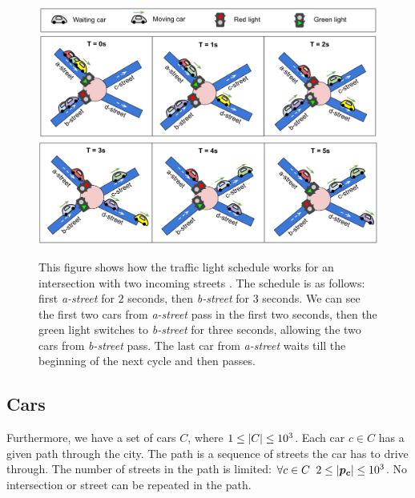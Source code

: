\begin{figure}[ht] %
    \centering
    \includegraphics[width=\linewidth]{img/hashcode/figure2-abc.png}
    \includegraphics[width=\linewidth]{img/hashcode/figure2-def.png}
    \caption[Example of a traffic light schedule]{
        This figure shows how the traffic light schedule works for an intersection with two incoming streets \cite{google_coding_competitions}.
        The schedule is as follows: first \textit{a-street} for $2$ seconds, then \textit{b-street} for $3$ seconds.
        We can see the first two cars from \textit{a-street} pass in the first two seconds, then the green light switches to \textit{b-street} for three seconds,
        allowing the two cars from \textit{b-street} pass. The last car from \textit{a-street} waits till the beginning of the next cycle and then passes.
    }
    \label{fig:hashcode_traffic_lights}
\end{figure}

\subsection{Cars}

Furthermore, we have a set of cars $C$, where $1 \leq \left|{C}\right| \leq 10^3$. Each car $c \in C$ has a given path through the city. The path is a sequence of streets the car has to drive through. The number of streets in the path is limited: $\forall c \in C \;\; 2 \leq \left|{\bm{p_c}}\right| \leq 10^3$. No intersection or street can be repeated in the path.

